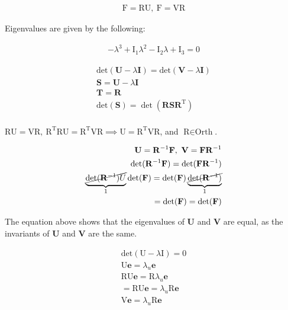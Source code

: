 \begin{problem}
\begin{enumerate}
\begin{enumerate}
                \begin{align}
                \text{F}=\text{RU}, \ \text{F}=\text{VR}
                \end{align}
                
                
                Eigenvalues are given by the following:
                
                
                \begin{align}
                -\lambda^3+\text{I}_{1}\lambda^2-\text{I}_{2}\lambda+\text{I}_{3}=0
                \end{align}
            
                \begin{align}
                \text{det}(\mathbf{U}-\lambda \mathbf{I})=\text{det}(\mathbf{V}-\lambda \mathbf{I}) \\
                \mathbf{S}=\mathbf{U}-\lambda \mathbf{I} \\
                \mathbf{T}=\mathbf{R} \\
                \text{det}(\mathbf{S})=\det(\mathbf{R}\mathbf{S}\mathbf{R}^{\text{T}}) \\
                \end{align}
                
                
                $\text{RU}=\text{VR}, \ \text{R}^{\text{T}}\text{R}\text{U}=\text{R}^{\text{T}}\text{V}\text{R}\implies \text{U}=\text{R}^{\text{T}}\text{V}\text{R}$, and $\text{R}\in \text{Orth}$.
                
                
                \begin{align}
                \mathbf{U}=\mathbf{R}^{-1}\mathbf{F}, \ \mathbf{V}=\mathbf{F}\mathbf{R}^{-1} \\
                \det(\mathbf{R}^{-1}\mathbf{F})=\det(\mathbf{F}\mathbf{R}^{-1}) \\
                \underbrace{ \cancel{ \det(\mathbf{R}^{-1})U } }_{ 1 }\det(\mathbf{F})=\det(\mathbf{F})\underbrace{ \cancel{ \det(\mathbf{R}^{-1}) } }_{ 1 } \\
                =\det(\mathbf{F})=\det(\mathbf{F})
                \end{align}
                
                
                The equation above shows that the eigenvalues of $\mathbf{U}$ and $\mathbf{V}$ are equal, as the invariants of $\mathbf{U}$ and $\mathbf{V}$ are the same.
                
            
                \begin{align}
                \text{det}(\text{U}-\lambda \text{I})=0 \\
                \text{U}\mathbf{e}=\lambda_{u}\mathbf{e} \\
                \text{RU}\mathbf{e}=\text{R}\lambda_{u}\mathbf{e} \\
                =\text{RU}\mathbf{e}=\lambda_{u}\text{R}\mathbf{e} \\
                \text{V}\mathbf{e}=\lambda_{u}\text{R}\mathbf{e}
                \end{align}
                

\end{enumerate}
\end{enumerate}
\end{problem}
